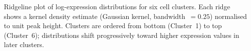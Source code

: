 \caption{Ridgeline plot of log-expression distributions for six cell clusters. Each ridge shows a kernel density estimate (Gaussian kernel, bandwidth~$= 0.25$) normalised to unit peak height. Clusters are ordered from bottom (Cluster~1) to top (Cluster~6); distributions shift progressively toward higher expression values in later clusters.}

